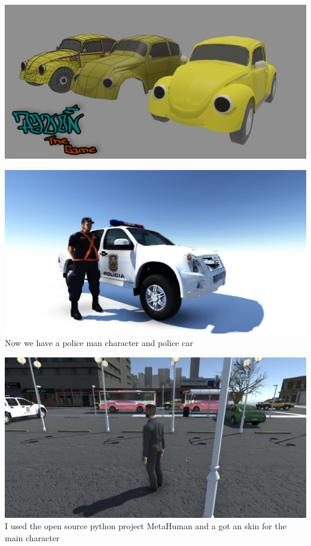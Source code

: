 \documentclass{article}
\begin{document}
  \includegraphics[width=\textwidth]{73.png}
  
  \includegraphics[width=\textwidth]{38.jpg}
  Now we have a police man character and police car
  
  \includegraphics[width=\textwidth]{57.jpg}
  I used the open source python project MetaHuman and a got an skin for the main character
\end{document}
